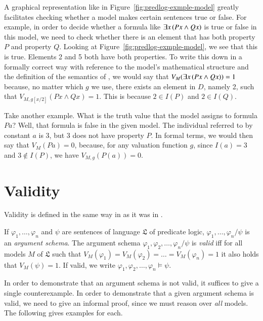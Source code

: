 \documentclass[nobib,nofonts]{tufte-handout}
\newcommand{\proplog}{\acro{PropLog}}
\newcommand{\predlog}{\acro{PredLog}}
\begin{document}
A graphical representation like in Figure~\ref{fig:predlog-exmple-model} greatly facilitates checking whether a model makes certain sentences true or false.
For example, in order to decide whether a formula like $\exists x \thinspace (Px \wedge Qx)$ is true or false in this model, we need to check whether there is an element that has both property $P$ and property $Q$.
Looking at Figure~\ref{fig:predlog-exmple-model}, we see that this is true.
Elements 2 and 5 both have both properties.
To write this down in a formally correct way with reference to the model's mathematical structure and the definition of the semantics of \predlog, we would say that $V_{M}(\exists x \thinspace (Px \wedge Qx)) = 1$ because, no matter which $g$ we use, there exists an element in $D$, namely 2, such that $V_{M,g[x/2]}(Px \wedge Qx) = 1$. This is because $2 \in I(P)$ and $2 \in I(Q)$.

Take another example.
What is the truth value that the model assigns to formula $Pa$?
Well, that formula is false in the given model.
The individual referred to by constant $a$ is 3, but 3 does not have property $P$.
In formal terms, we would then say that $V_{M}(Pa) = 0$, because, for any valuation function $g$, since $I(a) = 3$ and $3 \not \in I(P)$, we have $V_{M,g}(P(a)) = 0$.



\section{Validity}
\label{sec:validity}

Validity is defined in the same way in \predlog as it was in \proplog.

If $\varphi_1, \dots, \varphi_n$ and $\psi$ are sentences of language $\mathfrak{L}$ of predicate logic, $\varphi_1, \dots, \varphi_n / \psi$ is an \emph{argument schema}.
The argument schema $\varphi_1, \varphi_2, \dots, \varphi_n / \psi$ is \emph{valid} iff for all models $M$ of $\mathfrak{L}$ such that $V_M(\varphi_1)=V_M(\varphi_2)= \dots = V_M(\varphi_n)=1$ it also holds that $V_M(\psi) = 1$.
If valid, we write $\varphi_1, \varphi_2, \dots, \varphi_n \models \psi$.

In order to demonstrate that an argument schema is not valid, it suffices to give a single counterexample.
In order to demonstrate that a given argument schema is valid, we need to give an informal proof, since we must reason over \emph{all} models. %
The following gives examples for each.
\end{document}
